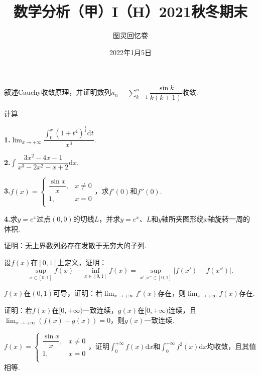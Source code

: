 \documentclass[UTF8,14pt,normal]{ctexart}
\title{\vspace{-5em}\bf 数学分析（甲）I（H）2021秋冬期末}
\author{图灵回忆卷}
\date{2022年1月5日}
\begin{document}
    \maketitle 
    
     叙述Cauchy收敛原理，并证明数列$a_n=\displaystyle\sum_{k=1}^n\dfrac{\sin k}{k(k+1)}$收敛.
    
    计算\vspace{1em}
    
    \textbf{1.}$\displaystyle\lim_{x\to +\infty}\dfrac{\int_0^x(1+t^4)^\frac{1}{4}\mathrm dt}{x^3}$.\vspace{1em}
    
    \textbf{2.}$\displaystyle\int\dfrac{3x^2-4x-1}{x^3-2x^2-x+2}\mathrm dx$.\vspace{1em}
    
    \textbf{3.}$f(x)=\begin{cases}\dfrac{\sin x}{x}, &x\neq 0\\1, &x=0\\\end{cases}$，求$f'(0)$和$f''(0)$.\vspace{1em}
    
    \textbf{4.}求$y=e^x$过点$(0, 0)$的切线$L$，并求$y=e^x$、$L$和$y$轴所夹图形绕$x$轴旋转一周的体积.\vspace{1em}
    
    证明：无上界数列必存在发散于无穷大的子列.\vspace{0.5em}
    
    设$f(x)$在$[0, 1]$上定义，证明：\vspace{-0.5em}
    $$\displaystyle\sup_{x\in[0,1]}f(x)-\displaystyle\inf_{x\in[0,1]}f(x)=\displaystyle\sup_{x',x''\in[0,1]}\left|f(x')-f(x'')\right|.$$
    
    $f(x)$在$(0,1)$可导，证明：若$\displaystyle\lim_{x\to+\infty}f'(x)$存在，则$\displaystyle\lim_{x\to+\infty}f(x)$存在.\vspace{0.5em}
    
    证明：若$f(x)$在$[0,+\infty)$一致连续，$g(x)$在$[0,+\infty)$连续，且\\
    $\displaystyle\lim_{x\to+\infty}\left(f(x)-g(x)\right)=0$，则$g(x)$一致连续.\vspace{1em}
    
    $f(x)=\begin{cases}\dfrac{\sin x}{x}, &x\neq 0\\1, &x=0\\\end{cases}$，证明$\displaystyle\int_0^{+\infty}f(x)\mathrm dx$和$\displaystyle\int_0^{+\infty}f^2(x)\mathrm dx$均收敛，且其值相等.\vspace{0.5em}
    
\end{document}
